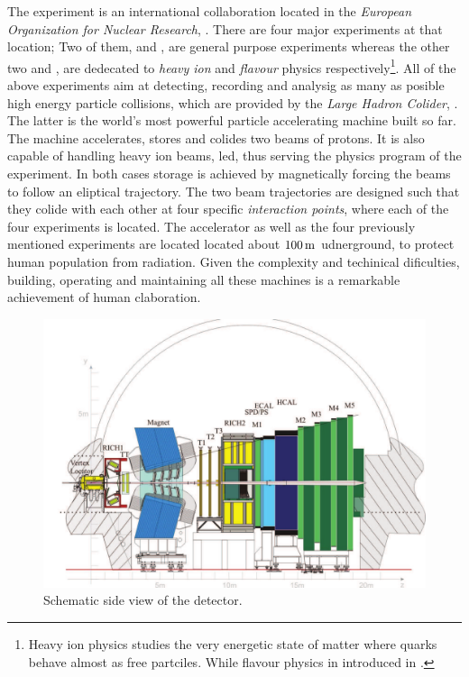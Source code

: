 
The \lhcb experiment is an international collaboration located in the {\it European Organization for Nuclear Research}, \cern.
There are four major experiments at that location; Two of them, \atlas and \cms, are general purpose experiments whereas the other
two \alice and \lhcb, are dedecated to {\it heavy ion} and {\it flavour} physics respectively\footnote{Heavy ion physics studies
the very energetic state of matter where quarks behave almost as free partciles. While flavour physics in introduced in .}.
All of the above experiments aim at detecting, recording and analysig as many as
posible high energy particle collisions, which are provided by the {\it Large Hadron Colider}, \lhc.
The latter is the world's most powerful particle accelerating machine built so far.
The \lhc machine accelerates, stores and colides two beams of protons. It is also capable of handling
heavy ion beams, \eg led, thus serving the physics program of the \alice experiment.
In both cases storage is achieved by magnetically forcing the beams to follow an eliptical trajectory.
The two beam trajectories are designed such that they colide with each other at four specific {\it interaction points},
where each of the four experiments is located. The \lhc accelerator as well as the four previously mentioned
experiments are located located about $100\rm \,m$ udnerground, to protect human population from radiation.
Given the complexity and techinical dificulties, building, operating and maintaining all these machines
is a remarkable achievement of human claboration.

\begin{figure}[t]
  \centering
  \includegraphics[width=\textwidth]{Figures/Chapter2/detector_cross_cmyk}
  \caption{Schematic side view of the \lhcb detector.}
  \label{lhcb_detector_cross_section}
\end{figure}


